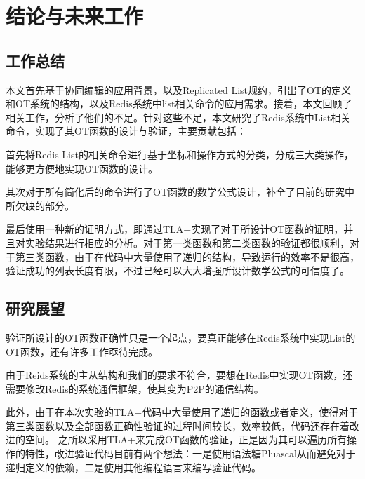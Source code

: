 \chapter{结论与未来工作}
\label{chapter:conclusion_future_work}
\section{工作总结}
\par 本文首先基于协同编辑的应用背景，以及Replicated List规约，引出了OT的定义和OT系统的结构，以及Redis系统中list相关命令的应用需求。接着，本文回顾了相关工作，分析了他们的不足。针对这些不足，本文研究了Redis系统中List相关命令，实现了其OT函数的设计与验证，主要贡献包括：
\par 首先将Redis List的相关命令进行基于坐标和操作方式的分类，分成三大类操作，能够更方便地实现OT函数的设计。
\par 其次对于所有简化后的命令进行了OT函数的数学公式设计，补全了目前的研究中所欠缺的部分。
\par 最后使用一种新的证明方式，即通过TLA+实现了对于所设计OT函数的证明，并且对实验结果进行相应的分析。对于第一类函数和第二类函数的验证都很顺利，对于第三类函数，由于在代码中大量使用了递归的结构，导致运行的效率不是很高，验证成功的列表长度有限，不过已经可以大大增强所设计数学公式的可信度了。
\section{研究展望}
验证所设计的OT函数正确性只是一个起点，要真正能够在Redis系统中实现List的OT函数，还有许多工作亟待完成。

由于Reids系统的主从结构和我们的要求不符合，要想在Redis中实现OT函数，还需要修改Redis的系统通信框架，使其变为P2P的通信结构。

此外，由于在本次实验的TLA+代码中大量使用了递归的函数或者定义，使得对于第三类函数以及全部函数正确性验证的过程时间较长，效率较低，代码还存在着改进的空间。
之所以采用TLA+来完成OT函数的验证，正是因为其可以遍历所有操作的特性，改进验证代码目前有两个想法：一是使用语法糖Pluascal从而避免对于递归定义的依赖，二是使用其他编程语言来编写验证代码。